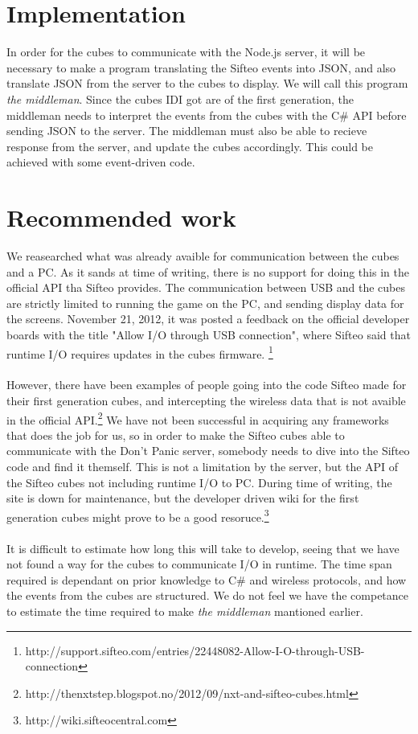 \section{Implementation}

In order for the cubes to communicate with the Node.js server, it will be necessary to make a program translating the Sifteo events into JSON, and also translate JSON from the server to the cubes to display. We will call this program \emph{the middleman}. Since the cubes IDI got are of the first generation, the middleman needs to interpret the events from the cubes with the C\# API before sending JSON to the server. The middleman must also be able to recieve response from the server, and update the cubes accordingly. This could be achieved with some event-driven code.



\section{Recommended work}

We reasearched what was already avaible for communication between the cubes and a PC. As it sands at time of writing, there is no support for doing this in the official API tha Sifteo provides. The communication between USB and the cubes are strictly limited to running the game on the PC, and sending display data for the screens. November 21, 2012, it was posted a feedback on the official developer boards with the title "Allow I/O through USB connection", where Sifteo said that runtime I/O requires updates in the cubes firmware.
\footnote{http://support.sifteo.com/entries/22448082-Allow-I-O-through-USB-connection}\\
\\
However, there have been examples of people going into the code Sifteo made for their first generation cubes, and intercepting the wireless data that is not avaible in the official API.\footnote{http://thenxtstep.blogspot.no/2012/09/nxt-and-sifteo-cubes.html} 
We have not been successful in acquiring any frameworks that does the job for us, so in order to make the Sifteo cubes able to communicate with the Don't Panic server, somebody needs to dive into the Sifteo code and find it themself. This is not a limitation by the server, but the API of the Sifteo cubes not including runtime I/O to PC. During time of writing, the site is down for maintenance, but the developer driven wiki for the first generation cubes might prove to be a good resoruce.\footnote{http://wiki.sifteocentral.com}\\
\\
It is difficult to estimate how long this will take to develop, seeing that we have not found a way for the cubes to communicate I/O in runtime. The time span required is dependant on prior knowledge to C\# and wireless protocols, and how the events from the cubes are structured. We do not feel we have the competance to estimate the time required to make \emph{the middleman} mantioned earlier.


